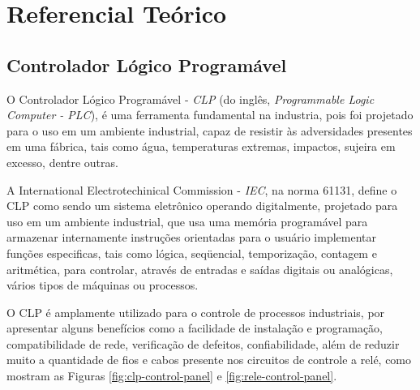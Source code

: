 \documentclass[a4paper, 12pt]{article}
\begin{document}
\section{Referencial Teórico}

	\subsection{Controlador Lógico Programável}
	
		O Controlador Lógico Programável - \textit{CLP} (do inglês, \textit{Programmable Logic Computer - PLC}),
		é uma ferramenta fundamental na industria, pois foi projetado para o uso em um
		ambiente industrial, capaz de resistir às adversidades presentes em uma fábrica,
		tais como água, temperaturas extremas, impactos, sujeira em excesso, dentre outras.
		
		A International Electrotechinical Commission - \textit{IEC}, na norma 61131, define
		o CLP como sendo um sistema eletrônico operando digitalmente, projetado 
		para uso em um ambiente industrial, que usa uma  	memória programável para armazenar
		internamente instruções orientadas para o usuário implementar funções especificas,
		tais como lógica, seqüencial, temporização, contagem e aritmética, para controlar,
		através de entradas e saídas	digitais ou analógicas, vários tipos de máquinas ou 
		processos.
	
		O CLP é amplamente utilizado para o controle de processos industriais, por apresentar
		alguns benefícios como a facilidade de instalação e programação, compatibilidade de rede,
		verificação de defeitos, confiabilidade, além de reduzir muito a quantidade de fios e cabos
		presente nos circuitos de controle a relé, como mostram as Figuras \ref{fig:clp-control-panel} e \ref{fig:rele-control-panel}.
		
\end{document}

